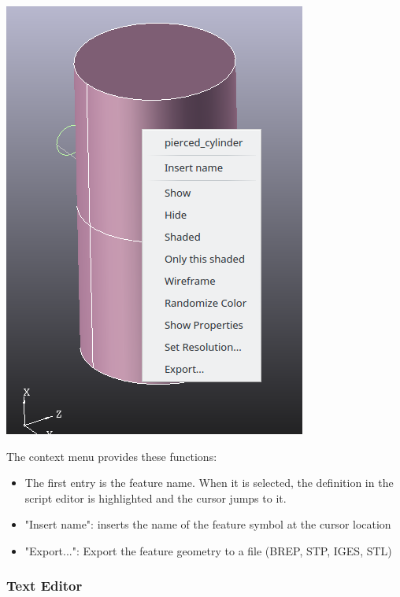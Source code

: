 \includegraphics[width=\linewidth]{figs/iscad/screen_iscad_contextmenu_3d}

The context menu provides these functions:

\begin{itemize}
\item The first entry is the feature name. When it is selected, the
    definition in the script editor is highlighted and the cursor jumps
    to it.
\item "Insert name": inserts the name of the feature symbol at the cursor
    location
\item "Export...": Export the feature geometry to a file (BREP, STP, IGES, STL)
\end{itemize}


\subsubsection{Text Editor}

